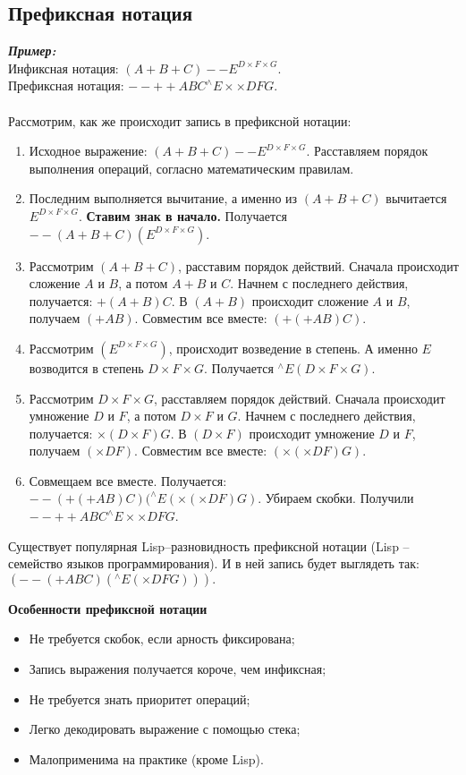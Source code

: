 \subsection{Префиксная нотация}
\textbf{\emph{Пример:}}
\\Инфиксная нотация: $(A + B + C) -- E^{D\times F\times G}.$
\\Префиксная нотация: $--++ABC^{\wedge}E\times\times DFG.$
\\
\\Рассмотрим, как же происходит запись в префиксной нотации:
\begin{enumerate}
 \item Исходное выражение: $(A + B + C) -- E^{D\times F\times G}$. Расставляем порядок выполнения операций, согласно математическим правилам.
\item Последним выполняется вычитание, а именно из $(A + B + C)$ вычитается $E^{D\times F\times G}$. \textbf{Ставим знак в начало.} Получается $--(A + B + C)(E^{D\times F\times G})$.
\item Рассмотрим $(A + B + C)$, расставим порядок действий. Сначала происходит сложение $A$ и $B$, а потом $A+B$ и $C$. Начнем с последнего действия, получается: $+(A+B)C$. В $(A+B)$ происходит сложение $A$ и $B$, получаем $(+AB)$. Совместим все вместе: $(+(+AB)C)$.
\item Рассмотрим $(E^{D\times F\times G})$, происходит возведение в степень. А именно $E$ возводится в степень $D\times F\times G$. Получается $^{\wedge}E(D\times F\times G)$.
\item Рассмотрим $D\times F\times G$, расставляем порядок действий. Сначала происходит умножение $D$ и $F$, а потом $D\times F$ и $G$. Начнем с последнего действия, получается: $\times(D \times F)G$. В $(D \times F)$ происходит умножение $D$ и $F$, получаем $(\times DF)$. Совместим все вместе: $(\times(\times DF)G)$.
\item Совмещаем все вместе. Получается: $--(+(+AB)C)(^{\wedge}E(\times(\times DF)G)$. Убираем скобки. Получили $--++ABC^{\wedge}E\times\times DFG$.
\end{enumerate}
Существует популярная Lisp--разновидность префиксной нотации (Lisp -- семейство языков программирования). И в ней запись будет выглядеть так: $(--(+ABC)(^{\wedge}E(\times DFG))).$
\begin{center}
  \textbf{Особенности префиксной нотации}
\end{center}
\begin{itemize}
  \item Не требуется скобок, если арность фиксирована;
  \item Запись выражения получается короче, чем инфиксная;
  \item Не требуется знать приоритет операций;
  \item Легко декодировать выражение с помощью стека;
  \item Малоприменима на практике (кроме Lisp).
\end{itemize}
